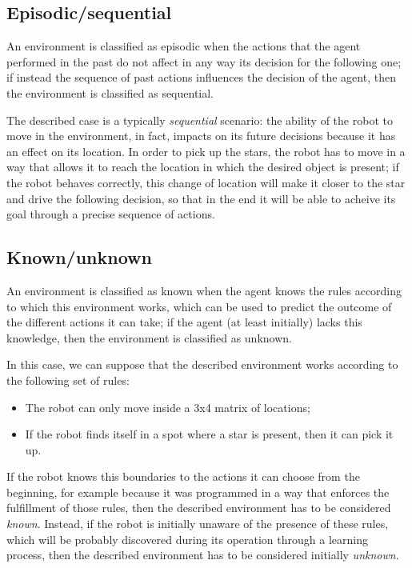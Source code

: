 \documentclass[letterpaper,headings=standardclasses]{scrartcl}
\begin{document}
\subsection{Episodic/sequential}

An environment is classified as episodic when the actions that the agent performed in the past do not affect in any way its decision for the following one; if instead the sequence of past actions influences the decision of the agent, then the environment is classified as sequential.

The described case is a typically \emph{sequential} scenario: the ability of the robot to move in the environment, in fact, impacts on its future decisions because it has an effect on its location. In order to pick up the stars, the robot has to move in a way that allows it to reach the location in which the desired object is present; if the robot behaves correctly, this change of location will make it closer to the star and drive the following decision, so that in the end it will be able to acheive its goal through a precise sequence of actions.

\subsection{Known/unknown}

An environment is classified as known when the agent knows the rules according to which this environment works, which can be used to predict the outcome of the different actions it can take; if the agent (at least initially) lacks this knowledge, then the environment is classified as unknown.

In this case, we can suppose that the described environment works according to the following set of rules:

\begin{itemize}

\item The robot can only move inside a 3x4 matrix of locations;
\item If the robot finds itself in a spot where a star is present, then it can pick it up.

\end{itemize}

If the robot knows this boundaries to the actions it can choose from the beginning, for example because it was programmed in a way that enforces the fulfillment of those rules, then the described environment has to be considered \emph{known}. Instead, if the robot is initially unaware of the presence of these rules, which will be probably discovered during its operation through a learning process, then the described environment has to be considered initially \emph{unknown}.
\end{document}
